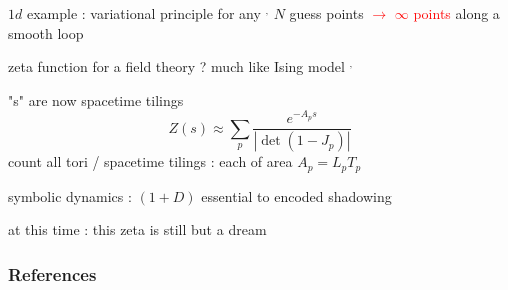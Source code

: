 \begin{frame}{$1d$ example : variational principle for any {\po}
    $^,$
}
$N$ guess points \textcolor{red}{$\to$ $\infty$ points}
along a smooth loop
\end{frame}



\begin{frame}{zeta function for a field theory ? much like Ising model
    $^,$
}
\begin{block}{"\po s" are now spacetime tilings}
\[
Z(s) \approx
\sum_{p} \frac{e^{-A_p s}}
              {\left|\det(1-J_p)\right|}
\]
count all tori / spacetime tilings :
each of area $A_p = L_p T_p$
\end{block}
\begin{block}{symbolic dynamics : $(1+D)$\dmn}
essential to encoded shadowing
\end{block}

\vfill
at this time : this zeta is still but a dream
\end{frame}


\begin{frame}[t, allowframebreaks]
  \frametitle{References}
  \scriptsize{ %
  \printbibliography
   } %
\end{frame}


